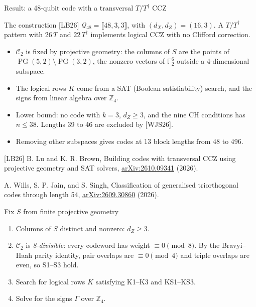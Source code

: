 \documentclass[aspectratio=169,11pt]{beamer}
\newcommand{\qcode}[3]{\llbracket #1,#2,#3\rrbracket}
\newcommand{\source}[1]{\par\vfill{\tiny\color{black!60}\setlength{\parskip}{1pt}#1\par}}
\newcommand{\refWJS}{[WJS26] A. Wills, S. P. Jain, and S. Singh, Classification of generalised triorthogonal codes through length 54, \href{https://arxiv.org/abs/2609.30860}{arXiv:2609.30860} (2026).}
\newcommand{\refLB}{[LB26] B. Lu and K. R. Brown, Building codes with transversal CCZ using projective geometry and SAT solvers, \href{https://arxiv.org/abs/2610.09341}{arXiv:2610.09341} (2026).}
\newcommand{\talktext}{\small\setlength{\parskip}{2.5pt}\setlength{\abovedisplayskip}{5pt}\setlength{\belowdisplayskip}{5pt}\setlength{\abovedisplayshortskip}{3pt}\setlength{\belowdisplayshortskip}{3pt}}
\newcommand{\F}{\mathbb F}
\newcommand{\PG}{\operatorname{PG}}
\newcommand{\C}{\mathcal C}
\begin{document}
\begin{frame}[label=results]{Result: a 48-qubit code with a transversal $T/T^\dagger$ CCZ}
\talktext
\begin{block}{The construction [LB26]}
$\mathcal Q_{48}=\qcode{48}{3}{3}$, with $(d_X,d_Z)=(16,3)$. A $T/T^\dagger$ pattern with $26\,T$ and $22\,T^\dagger$ implements logical CCZ with no Clifford correction.
\end{block}
\begin{itemize}\setlength{\itemsep}{3pt}
\item $\C_2$ is fixed by projective geometry: the columns of $S$ are the points of $\PG(5,2)\setminus\PG(3,2)$, the nonzero vectors of $\F_2^6$ outside a 4-dimensional subspace.
\item The logical rows $K$ come from a SAT (Boolean satisfiability) search, and the signs from linear algebra over $\mathbb Z_4$.
\item Lower bound: no code with $k=3$, $d_Z\ge3$, and the nine CH conditions has $n\le38$. Lengths 39 to 46 are excluded by [WJS26].
\item Removing other subspaces gives codes at 13 block lengths from 48 to 496.
\end{itemize}
\source{\refLB\par\refWJS}
\end{frame}

\begin{frame}[label=fix-s]{Fix $S$ from finite projective geometry}
\talktext
\begin{enumerate}\setlength{\itemsep}{6pt}
\item<1-> Columns of $S$ distinct and nonzero: $d_Z\ge3$.
\item<2-> $\C_2$ is \emph{8-divisible}: every codeword has weight $\equiv0\pmod8$. By the Bravyi--Haah parity identity, pair overlaps are $\equiv0\pmod4$ and triple overlaps are even, so S1--S3 hold.
\item<3-> Search for logical rows $K$ satisfying K1--K3 and KS1--KS3.
\item<4-> Solve for the signs $\Gamma$ over $\mathbb Z_4$.
\end{enumerate}
\end{frame}
\end{document}
